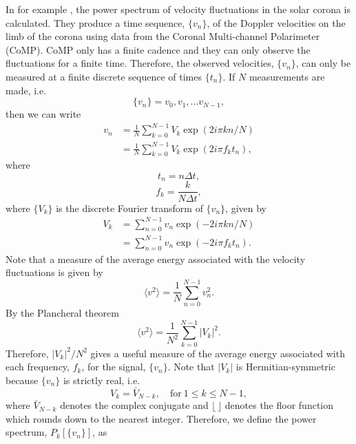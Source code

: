 In for example \citet{Morton2016,Morton2019}, the power spectrum of velocity fluctuations in the solar corona is calculated. They produce a time sequence, $\{v_n\}$, of the Doppler velocities on the limb of the corona using data from the Coronal Multi-channel Polarimeter (CoMP). CoMP only has a finite cadence and they can only observe the fluctuations for a finite time. Therefore, the observed velocities, $\{v_n\}$, can only be measured at a finite discrete sequence of times $\{t_n\}$. If $N$ measurements are made, i.e.
\[\{v_n\}=v_0, v_1, ... v_{N-1},\]
then we can write 
\[\begin{aligned}
v_n &= \frac{1}{N}\sum_{k=0}^{N-1}V_k\exp(2i\pi  k n / N) \\
&= \frac{1}{N}\sum_{k=0}^{N-1}V_k\exp(2i\pi f_k t_n),
\end{aligned}\]
where
\[t_n = n\Delta t,\]
\[f_k = \frac{k}{N \Delta t},\]
where $\{V_k\}$ is the discrete Fourier transform of $\{v_n\}$, given by
\[\begin{aligned}
V_k&=\sum_{n=0}^{N-1}v_n\exp(-2i\pi k n / N) \\
&=\sum_{n=0}^{N-1}v_n\exp(-2i\pi f_k t_n).
\end{aligned}\]
Note that a measure of the average energy associated with the velocity fluctuations is given by
\begin{equation}
    \langle v^2 \rangle = \frac{1}{N}\sum_{n=0}^{N-1}v_n^2.
\end{equation}
By the Plancheral theorem
\begin{equation}
    \langle v^2 \rangle = \frac{1}{N^2}\sum_{k=0}^{N-1}|V_k|^2.
\end{equation}
Therefore, $|V_k|^2/N^2$ gives a useful measure of the average energy associated with each frequency, $f_k$, for the signal, $\{v_n\}$. Note that $|V_k|$ is Hermitian-symmetric because $\{v_n\}$ is strictly real, i.e.
\begin{equation}
    V_k = \bar{V}_{N-k},\quad \text{for}\ 1 \le k\le N-1,
\end{equation}
where $\bar{V}_{N-k}$ denotes the complex conjugate and $\lfloor\,\rfloor$ denotes the floor function which rounds down to the nearest integer. Therefore, we define the power spectrum, $P_k[\{v_n\}]$, as
